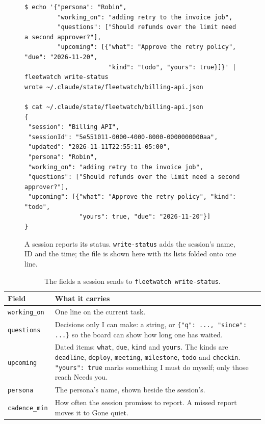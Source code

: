 \documentclass[11pt, letterpaper]{article}
\newenvironment{code}{\par\smallskip\small}{\par\smallskip}
\newcommand{\cmd}[1]{\texttt{#1}}
\begin{document}
\begin{figure}[htbp]
\begin{code}
\begin{verbatim}
$ echo '{"persona": "Robin",
         "working_on": "adding retry to the invoice job",
         "questions": ["Should refunds over the limit need a second approver?"],
         "upcoming": [{"what": "Approve the retry policy", "due": "2026-11-20",
                       "kind": "todo", "yours": true}]}' | fleetwatch write-status
wrote ~/.claude/state/fleetwatch/billing-api.json

$ cat ~/.claude/state/fleetwatch/billing-api.json
{
 "session": "Billing API",
 "sessionId": "5e551011-0000-4000-8000-0000000000aa",
 "updated": "2026-11-11T22:55:11-05:00",
 "persona": "Robin",
 "working_on": "adding retry to the invoice job",
 "questions": ["Should refunds over the limit need a second approver?"],
 "upcoming": [{"what": "Approve the retry policy", "kind": "todo",
               "yours": true, "due": "2026-11-20"}]
}
\end{verbatim}
\end{code}
  \caption{A session reports its status. \cmd{write-status} adds the session's name, ID and
    the time; the file is shown here with its lists folded onto one line.}
  \label{fig:status}
\end{figure}

\begin{table}[htbp]
  \centering\small
  \caption{The fields a session sends to \cmd{fleetwatch write-status}.}
  \label{tab:fields}
  \begin{tabularx}{\linewidth}{@{}>{\raggedright\arraybackslash}p{2.6cm}X@{}}
    \toprule
    Field & What it carries \\
    \midrule
    \cmd{working\_on} & One line on the current task. \\
    \cmd{questions} & Decisions only I can make: a string, or \cmd{\{"q": ..., "since": ...\}}
      so the board can show how long one has waited. \\
    \cmd{upcoming} & Dated items: \cmd{what}, \cmd{due}, \cmd{kind} and \cmd{yours}. The kinds
      are \cmd{deadline}, \cmd{deploy}, \cmd{meeting}, \cmd{milestone}, \cmd{todo} and
      \cmd{checkin}. \cmd{"yours": true} marks something I must do myself; only those reach
      Needs you. \\
    \cmd{persona} & The persona's name, shown beside the session's. \\
    \cmd{cadence\_min} & How often the session promises to report. A missed report moves it
      to Gone quiet. \\
    \bottomrule
  \end{tabularx}
\end{table}
\end{document}
